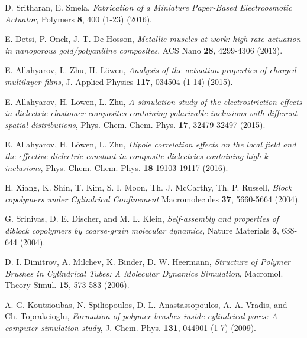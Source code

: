 \documentclass[3p,english,preprint]{elsarticle}
\begin{document}
\begin{thebibliography}{00}
D.  Sritharan, E. Smela, 
{\it Fabrication of a Miniature Paper-Based Electroosmotic Actuator}, 
Polymers {\bf  8},  400 (1-23) (2016).




E. Detsi, P. Onck, J. T. De Hosson,
{\it Metallic muscles at work: high rate actuation in nanoporous gold/polyaniline composites}, 
ACS Nano {\bf  28}, 4299-4306  (2013). 








E. Allahyarov, L. Zhu, H. L\"owen, 
{\it Analysis of the actuation properties of charged multilayer films},
 J. Applied Physics {\bf 117}, 034504 (1-14) (2015).



E. Allahyarov,  H. L\"owen, L. Zhu, 
{\it A simulation study of the electrostriction effects
in dielectric elastomer composites containing
polarizable inclusions with different spatial
distributions},
 Phys. Chem. Chem. Phys. {\bf 17}, 32479-32497  (2015).


E. Allahyarov,  H. L\"owen, L. Zhu, 
{\it Dipole correlation effects on the local field and
the effective dielectric constant in composite
dielectrics containing high-k inclusions}, 
Phys. Chem. Chem. Phys. {\bf 18} 19103-19117  (2016).







H. Xiang, K. Shin, T. Kim, S. I. Moon,
Th. J. McCarthy, Th. P. Russell, 
{\it Block copolymers under Cylindrical Confinement}
  Macromolecules {\bf 37}, 5660-5664 (2004).


G. Srinivas, D.  E. Discher, and M. L. Klein, 
{\it Self-assembly and properties of diblock copolymers by coarse-grain
molecular dynamics}, 
Nature Materials {\bf 3}, 638-644 (2004).


D. I. Dimitrov, A. Milchev, K. Binder, D. W. Heermann,
{\it Structure of Polymer Brushes in Cylindrical Tubes: A Molecular Dynamics Simulation},
Macromol. Theory Simul. {\bf 15}, 573-583 (2006).


A.  G. Koutsioubas, N.  Spiliopoulos, D.  L. Anastassopoulos,
A.  A. Vradis, and Ch. Toprakcioglu,
{\it Formation of polymer brushes inside cylindrical pores: A computer
simulation study}, 
J. Chem. Phys. {\bf 131},  044901 (1-7) (2009). 



 \end{thebibliography}
\end{document}
